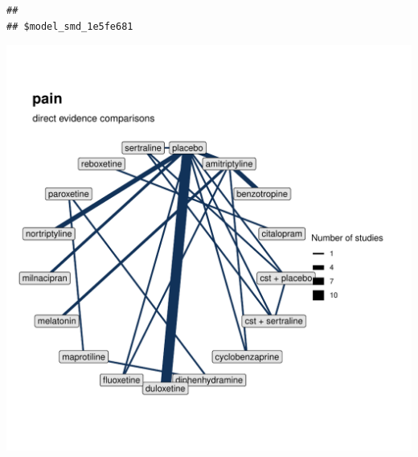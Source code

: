 \documentclass{article}\usepackage[]{graphicx}\usepackage[]{color}
\makeatletter
\newenvironment{kframe}{%
 \def\at@end@of@kframe{}%
 \ifinner\ifhmode%
  \def\at@end@of@kframe{\end{minipage}}%
  \begin{minipage}{\columnwidth}%
 \fi\fi%
 \def\FrameCommand##1{\hskip\@totalleftmargin \hskip-\fboxsep
 \colorbox{shadecolor}{##1}\hskip-\fboxsep
     \hskip-\linewidth \hskip-\@totalleftmargin \hskip\columnwidth}%
 \MakeFramed {\advance\hsize-\width
   \@totalleftmargin\z@ \linewidth\hsize
   \@setminipage}}%
 {\par\unskip\endMakeFramed%
 \at@end@of@kframe}
\newenvironment{knitrout}{}{} %
\makeatother
\begin{document}
\begin{knitrout}
\begin{kframe}\begin{verbatim}
## 
## $model_smd_1e5fe681
\end{verbatim}
\end{kframe}
\includegraphics[width=\textwidth]{figure/networks-8} 


\end{knitrout}
\end{document}
